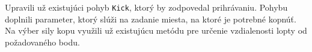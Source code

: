 Upravili už existujúci pohyb \texttt{Kick}, ktorý by zodpovedal prihrávaniu. Pohybu doplnili parameter, ktorý slúži na zadanie miesta, na ktoré je potrebné kopnúť. Na výber sily kopu využili už existujúcu metódu pre určenie vzdialenosti lopty od požadovaného bodu.



